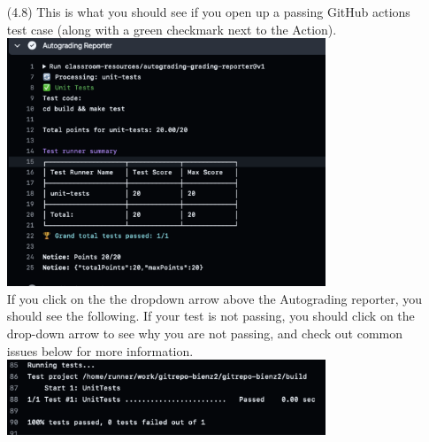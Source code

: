 \documentclass{article} %
\begin{document}
\begin{enumerate}
    \item [(4.8)] This is what you should see if you open up a passing GitHub actions test case (along with a green checkmark next to the Action).\\
    \includegraphics[width=0.75\textwidth]{figs/pass_autograder.png}\\
    If you click on the the dropdown arrow above the Autograding reporter, you should see the following.  If your test is not passing, you should click on the drop-down arrow to see why you are not passing, and check out common issues below for more information.\\
    \includegraphics[width=0.75\textwidth]{figs/pass_test.png}
\end{enumerate}
\end{document}
